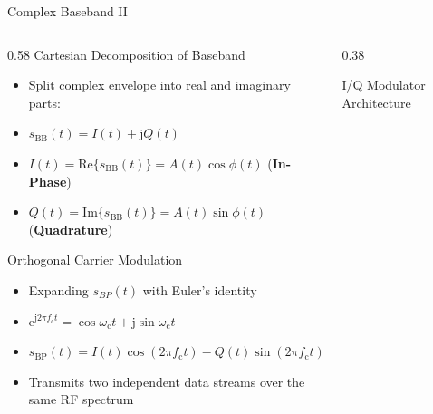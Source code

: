 \begin{frame}{Complex Baseband II}
\begin{columns}[T,onlytextwidth]
    \begin{column}{0.58\textwidth}
        Cartesian Decomposition of Baseband\\
        \begin{itemize}
            \item Split complex envelope into real and imaginary parts:
            \item $s_\mathrm{BB}(t) = I(t) + \mathrm{j} Q(t)$
            \item $I(t) = \mathrm{Re}\{s_\mathrm{BB}(t)\} = A(t)\cos\phi(t)$ (\textbf{In-Phase})
            \item $Q(t) = \mathrm{Im}\{s_\mathrm{BB}(t)\} = A(t)\sin\phi(t)$ (\textbf{Quadrature})
        \end{itemize}
        \vspace{0.8em}
        Orthogonal Carrier Modulation\\
        \begin{itemize}
            \item Expanding $s_{BP}(t)$ with Euler's identity 
            \item $\mathrm{e}^{\mathrm{j} 2\pi f_\mathrm{c} t} = \cos \omega_\mathrm{c} t + \mathrm{j} \sin \omega_\mathrm{c} t$
            \item $s_\mathrm{BP}(t) = I(t)\cos(2\pi f_\mathrm{c} t) - Q(t)\sin(2\pi f_\mathrm{c} t)$
            \item Transmits two independent data streams over the same RF spectrum
        \end{itemize}
    \end{column}

    \begin{column}{0.38\textwidth}
        \begin{block}{I/Q Modulator Architecture}
            \centering
        \end{block}
    \end{column}
\end{columns}
\end{frame}

